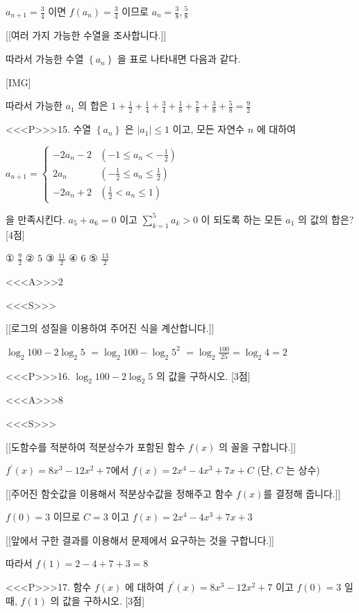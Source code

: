 \documentclass{oblivoir}
\begin{document}
$a_{n+1}=\frac{3}{4}$ 이면 $f\left(a_{n}\right)=\frac{3}{4} $ 이므로 $a_{n}=\frac{3}{8}, \frac{5}{8}$

[[여러 가지 가능한 수열을 조사합니다.]]

따라서 가능한 수열 $\left\{a_{n}\right\}$ 을 표로 나타내면 다음과 같다.

[IMG]

따라서 가능한 $a_{1}$ 의 합은 $1+\frac{1}{2}+\frac{1}{4}+\frac{3}{4}+\frac{1}{8}+\frac{7}{8}+\frac{3}{8}+\frac{5}{8}=\frac{9}{2}$


<<<P>>>15. 수열 $\left\{a_{n}\right\}$ 은 $\left|a_{1}\right| \leq 1$ 이고, 모든 자연수 $n$ 에 대하여

$a_{n+1}=\left\{\begin{array}{cl}
-2 a_{n}-2 & \left(-1 \leq a_{n}<-\frac{1}{2}\right)\\
2 a_{n} & \left(-\frac{1}{2} \leq a_{n} \leq \frac{1}{2}\right)\\
-2 a_{n}+2 & \left(\frac{1}{2}<a_{n} \leq 1\right)
\end{array}\right.$

을 만족시킨다. $a_{5}+a_{6}=0$ 이고 $\sum_{k=1}^{5} a_{k}>0$ 이 되도록 하는 모든 $a_{1}$ 의 값의 합은? [4점]

① $\frac{9}{2}$
② $5$
③ $\frac{11}{2}$
④ $6$
⑤ $\frac{13}{2}$

<<<A>>>$2$

<<<S>>>

[[로그의 성질을 이용하여 주어진 식을 계산합니다.]]

$ \log _{2} 100-2 \log _{2} 5$ $=\log _{2} 100-\log _{2} 5^{2}$
$=\log _{2} \frac{100}{25}=\log _{2} 4=2 $


<<<P>>>16. $\log _{2} 100-2 \log _{2} 5$ 의 값을 구하시오. [3점]

<<<A>>>$8$

<<<S>>>

[[도함수를 적분하여 적분상수가 포함된 함수 $f(x)$ 의 꼴을 구합니다.]]

$f^{\prime}(x)=8 x^{3}-12 x^{2}+7$에서
$f(x)=2 x^{4}-4 x^{3}+7 x+C $ (단, $C$ 는 상수)

[[주어진 함숫값을 이용해서 적분상수값을 정해주고 함수 $f(x)$를 결정해 줍니다.]]

$ f(0)=3 $ 이므로 $C=3 $ 이고 $ f(x)=2 x^{4}-4 x^{3}+7 x+3$ 

[[앞에서 구한 결과를 이용해서 문제에서 요구하는 것을 구합니다.]]

따라서 $f(1)=2-4+7+3=8$


<<<P>>>17. 함수 $f(x)$ 에 대하여 $f^{\prime}(x)=8 x^{3}-12 x^{2}+7$ 이고 $f(0)=3$ 일 때, $f(1)$ 의 값을 구하시오. [3점]
\end{document}
